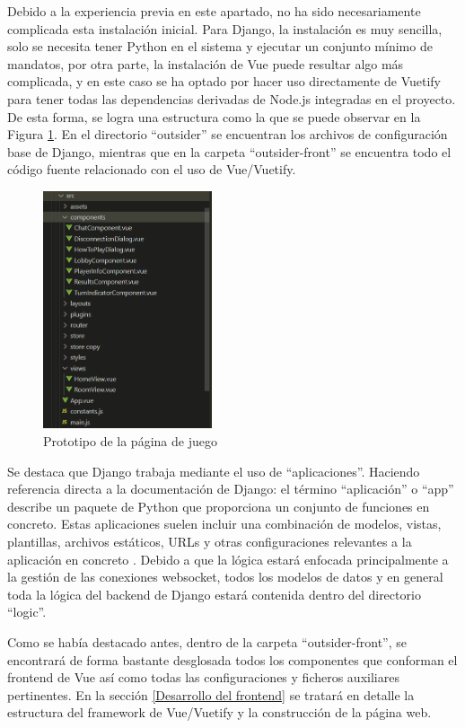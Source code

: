 Debido a la experiencia previa en este apartado, no ha sido necesariamente complicada esta instalación inicial. Para Django,
la instalación es muy sencilla, solo se necesita tener Python en el sistema y ejecutar un conjunto mínimo de mandatos, por otra parte,
la instalación de Vue puede resultar algo más complicada, y en este caso se ha optado por hacer uso directamente de Vuetify para
tener todas las dependencias derivadas de Node.js integradas en el proyecto. De esta forma, se logra una estructura
como la que se puede observar en la Figura \ref{fig:res_designJuego}. En el directorio ``outsider'' se encuentran los archivos 
de configuración base de Django, mientras que en la carpeta ``outsider-front'' se encuentra todo el código fuente relacionado 
con el uso de Vue/Vuetify.

\begin{figure}[h]
	\centering
	\includegraphics[height=7cm]{res_estructFronted.png}
	\caption{Prototipo de la página de juego}
	\label{fig:res_designJuego}
\end{figure}

Se destaca que Django trabaja mediante el uso de ``aplicaciones''. Haciendo referencia directa a la documentación de Django:
el término ``aplicación'' o ``app'' describe un paquete de Python que proporciona un conjunto de funciones en concreto. 
Estas aplicaciones suelen incluir una combinación de modelos, vistas, 
plantillas, archivos estáticos, URLs y otras configuraciones relevantes a la aplicación en concreto \cite{django}. Debido a que 
la lógica estará enfocada principalmente a la gestión de las conexiones websocket, todos los modelos de datos y en general toda 
la lógica del backend de Django estará contenida dentro del directorio ``logic''.

Como se había destacado antes, dentro de la carpeta ``outsider-front'', se encontrará de forma bastante desglosada todos los componentes
que conforman el frontend de Vue así como todas las configuraciones y ficheros auxiliares pertinentes. En la sección \ref{Desarrollo del frontend}
se tratará en detalle la estructura del framework de Vue/Vuetify y la construcción de la página web.

